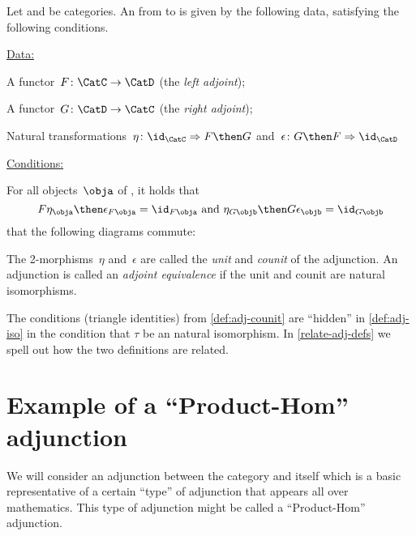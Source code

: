 \begin{ctdefinition}
    \label{def:adj-counit}
    \label{def:cat-adjunction-v2}
    Let \CatC and \CatD be categories. An \emph{} from \CatC to \CatD is given by the following data, satisfying the following conditions.

    \underline{Data:}
    \begin{compactenum}
        \item A functor~$F\colon \CatC \to \CatD$ (the \emph{left adjoint});
        \item A functor~$G\colon \CatD \to \CatC$ (the \emph{right adjoint});
        \item Natural transformations~$\eta \colon \id_\CatC \Rightarrow F \then G$ and~$\epsilon \colon G \then F \Rightarrow \id_\CatD$
    \end{compactenum}

    \underline{Conditions:}
    \begin{compactenum}
        \item For all objects~$\obja$ of \CatC, it holds that
        \begin{equation*}
            F\eta_\obja \then \epsilon_{F\obja} = \id_{F\obja} \text{ and }  \eta_{G\objb} \then G\epsilon_\objb = \id_{G\objb}
        \end{equation*}
         that the following diagrams commute:

        \begin{center}
        \end{center}
    \end{compactenum}

    The 2-morphisms~$\eta$ and~$\epsilon$ are called the \emph{unit} and \emph{counit} of the adjunction.
    An adjunction is called an \emph{adjoint equivalence} if the unit and counit are natural isomorphisms.
\end{ctdefinition}

\begin{remark}
    The conditions (triangle identities) from \cref{def:adj-counit} are ``hidden'' in \cref{def:adj-iso} in the condition that $\tau$ be an natural isomorphism. In \cref{relate-adj-defs} we spell out how the two definitions are related.
\end{remark}


\section{Example of a ``Product-Hom'' adjunction}
We will consider an adjunction between the category \Set and itself which is a basic representative of a certain ``type'' of adjunction that appears all over mathematics. This type of adjunction might be called a ``Product-Hom'' adjunction.


